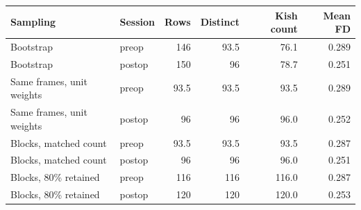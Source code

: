 \begin{tabular}{llrrrr}
\toprule
Sampling & Session & Rows & Distinct & Kish count & Mean FD \\
\midrule
Bootstrap & preop & 146 & 93.5 & 76.1 & 0.289 \\
Bootstrap & postop & 150 & 96 & 78.7 & 0.251 \\
Same frames, unit weights & preop & 93.5 & 93.5 & 93.5 & 0.289 \\
Same frames, unit weights & postop & 96 & 96 & 96.0 & 0.252 \\
Blocks, matched count & preop & 93.5 & 93.5 & 93.5 & 0.287 \\
Blocks, matched count & postop & 96 & 96 & 96.0 & 0.251 \\
Blocks, 80\% retained & preop & 116 & 116 & 116.0 & 0.287 \\
Blocks, 80\% retained & postop & 120 & 120 & 120.0 & 0.253 \\
\bottomrule
\end{tabular}
